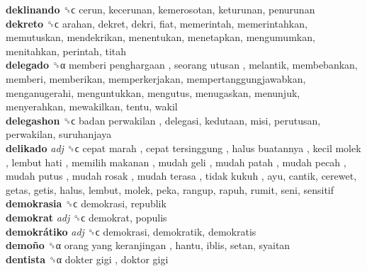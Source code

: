 \textbf{deklinando} ␝ϲ  cerun, kecerunan, kemerosotan, keturunan, penurunan  \\
\textbf{dekreto} ␝ϲ  arahan, dekret, dekri, fiat, memerintah, memerintahkan, memutuskan, mendekrikan, menentukan, menetapkan, mengumumkan, menitahkan, perintah, titah  \\
\textbf{delegado} ␝α   memberi penghargaan ,  seorang utusan , melantik, membebankan, memberi, memberikan, memperkerjakan, mempertanggungjawabkan, menganugerahi, menguntukkan, mengutus, menugaskan, menunjuk, menyerahkan, mewakilkan, tentu, wakil  \\
\textbf{delegashon} ␝ϲ   badan perwakilan , delegasi, kedutaan, misi, perutusan, perwakilan, suruhanjaya  \\
\textbf{delikado} \emph{adj}  ␝ϲ   cepat marah ,  cepat tersinggung ,  halus buatannya ,  kecil molek ,  lembut hati ,  memilih makanan ,  mudah geli ,  mudah patah ,  mudah pecah ,  mudah putus ,  mudah rosak ,  mudah terasa ,  tidak kukuh , ayu, cantik, cerewet, getas, getis, halus, lembut, molek, peka, rangup, rapuh, rumit, seni, sensitif  \\
\textbf{demokrasia} ␝ϲ  demokrasi, republik  \\
\textbf{demokrat} \emph{adj}  ␝ϲ  demokrat, populis  \\
\textbf{demokrátiko} \emph{adj}  ␝ϲ  demokrasi, demokratik, demokratis  \\
\textbf{demoño} ␝α   orang yang keranjingan , hantu, iblis, setan, syaitan  \\
\textbf{dentista} ␝α   dokter gigi ,  doktor gigi   \\
